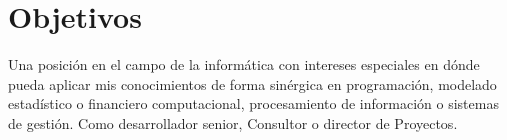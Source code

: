 \section{Objetivos}

Una posición en el campo de la informática con intereses especiales en dónde pueda aplicar mis
conocimientos de forma sinérgica en programación, modelado estadístico o financiero computacional,
procesamiento de información o sistemas de gestión. Como desarrollador senior, Consultor o director de Proyectos.

